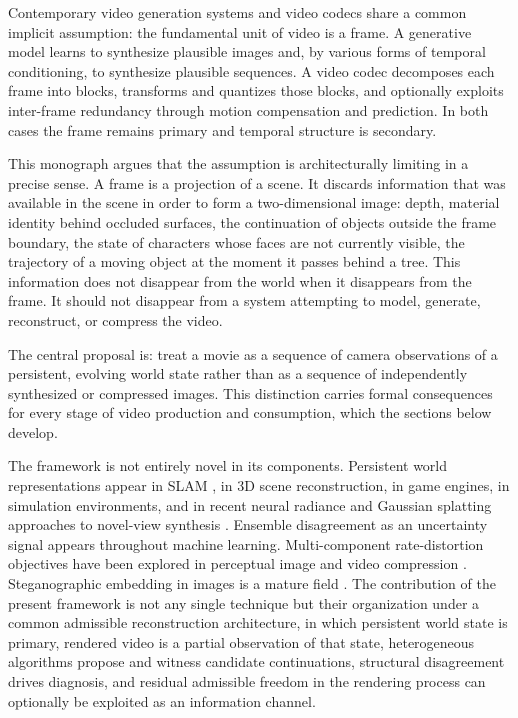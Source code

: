 \documentclass[12pt,a4paper]{article}
\theoremstyle{plain}
\theoremstyle{definition}
\theoremstyle{remark}
\begin{document}
Contemporary video generation systems and video codecs share a common implicit assumption: the fundamental unit of video is a frame. A generative model learns to synthesize plausible images and, by various forms of temporal conditioning, to synthesize plausible sequences. A video codec decomposes each frame into blocks, transforms and quantizes those blocks, and optionally exploits inter-frame redundancy through motion compensation and prediction. In both cases the frame remains primary and temporal structure is secondary.

This monograph argues that the assumption is architecturally limiting in a precise sense. A frame is a projection of a scene. It discards information that was available in the scene in order to form a two-dimensional image: depth, material identity behind occluded surfaces, the continuation of objects outside the frame boundary, the state of characters whose faces are not currently visible, the trajectory of a moving object at the moment it passes behind a tree. This information does not disappear from the world when it disappears from the frame. It should not disappear from a system attempting to model, generate, reconstruct, or compress the video.

The central proposal is: treat a movie as a sequence of camera observations of a persistent, evolving world state rather than as a sequence of independently synthesized or compressed images. This distinction carries formal consequences for every stage of video production and consumption, which the sections below develop.

The framework is not entirely novel in its components. Persistent world representations appear in SLAM \cite{davison2007monoslam}, in 3D scene reconstruction, in game engines, in simulation environments, and in recent neural radiance and Gaussian splatting approaches to novel-view synthesis \cite{mildenhall2020nerf,kerbl2023gaussians}. Ensemble disagreement as an uncertainty signal appears throughout machine learning. Multi-component rate-distortion objectives have been explored in perceptual image and video compression \cite{wang2004ssim}. Steganographic embedding in images is a mature field \cite{fridrich2009steganography}. The contribution of the present framework is not any single technique but their organization under a common admissible reconstruction architecture, in which persistent world state is primary, rendered video is a partial observation of that state, heterogeneous algorithms propose and witness candidate continuations, structural disagreement drives diagnosis, and residual admissible freedom in the rendering process can optionally be exploited as an information channel.
\end{document}

